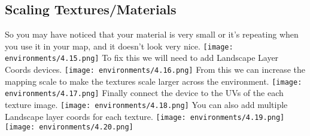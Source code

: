 \documentclass[../main.tex]{subfiles}
\begin{document}
\subsection{Scaling Textures/Materials}
So you may have noticed that your material is very small or it’s repeating when you use it in your map, and it doesn’t look very nice.
\texttt{[image: environments/4.15.png]}
To fix this we will need to add Landscape Layer Coords devices.
\texttt{[image: environments/4.16.png]}
From this we can increase the mapping scale to make the textures scale larger across the environment.
\texttt{[image: environments/4.17.png]}
Finally connect the device to the UVs of the each texture image.
\texttt{[image: environments/4.18.png]}
You can also add multiple Landscape layer coords for each texture.
\texttt{[image: environments/4.19.png]}
\texttt{[image: environments/4.20.png]}
\end{document}
